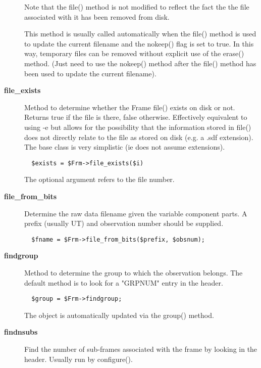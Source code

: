 \begin{description}
Note that the file() method is not modified to reflect the
fact the the file associated with it has been removed from disk.



This method is usually called automatically when the file()
method is used to update the current filename and the nokeep()
flag is set to true. In this way, temporary files can be removed
without explicit use of the erase() method. (Just need to
use the nokeep() method after the file() method has been used
to update the current filename).

\item[\textbf{file\_exists}] \mbox{}

Method to determine whether the Frame file() exists on disk or not.
Returns true if the file is there, false otherwise. Effectively
equivalent to using -e but allows for the possibility that the
information stored in file() does not directly relate to the
file as stored on disk (e.g. a .sdf extension). The base class is
very simplistic (ie does not assume extensions).

\begin{verbatim}
  $exists = $Frm->file_exists($i)
\end{verbatim}


The optional argument refers to the file number.

\item[\textbf{file\_from\_bits}] \mbox{}

Determine the raw data filename given the variable component
parts. A prefix (usually UT) and observation number should
be supplied.

\begin{verbatim}
  $fname = $Frm->file_from_bits($prefix, $obsnum);
\end{verbatim}
\item[\textbf{findgroup}] \mbox{}

Method to determine the group to which the observation belongs.
The default method is to look for a "GRPNUM" entry in the header.

\begin{verbatim}
  $group = $Frm->findgroup;
\end{verbatim}


The object is automatically updated via the group() method.

\item[\textbf{findnsubs}] \mbox{}

Find the number of sub-frames associated with the frame by looking in
the header. Usually run by configure().




\end{description}
